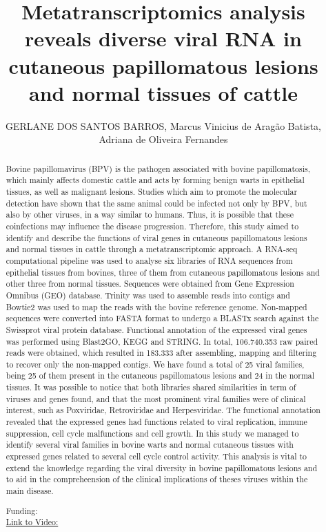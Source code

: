 \documentclass[twoside]{article}
\title{\vspace{-15mm}\fontsize{24pt}{10pt}\selectfont\textbf{ Metatranscriptomics analysis reveals diverse viral RNA in cutaneous papillomatous lesions and normal tissues of cattle }} %
\author{ GERLANE DOS SANTOS BARROS,  Marcus Vinicius de Arag\~ao Batista,  Adriana de Oliveira Fernandes }
\affil{ Federal University of Sergipe }
\date{}
\begin{document}
  
  
  \maketitle %
  
  
  \thispagestyle{fancy} %
  
  
  \begin{abstract}
  Bovine papillomavirus (BPV) is the pathogen associated with bovine papillomatosis,  which mainly affects domestic cattle and acts by forming benign warts in epithelial tissues,  as well as malignant lesions. Studies which aim to promote the molecular detection have shown that the same animal could be infected not only by BPV,  but also by other viruses,  in a way similar to humans. Thus,  it is possible that these coinfections may influence the disease progression. Therefore,  this study aimed to identify and describe the functions of viral genes in cutaneous papillomatous lesions and normal tissues in cattle through a metatranscriptomic approach. A RNA-seq computational pipeline was used to analyse six libraries of RNA sequences from epithelial tissues from bovines,  three of them from cutaneous papillomatous lesions and other three from normal tissues. Sequences were obtained from Gene Expression Omnibus (GEO) database. Trinity was used to assemble reads into contigs and Bowtie2 was used to map the reads with the bovine reference genome. Non-mapped sequences were converted into FASTA format to undergo a BLASTx search against the Swissprot viral protein database. Functional annotation of the expressed viral genes was performed using Blast2GO,  KEGG and STRING. In total,  106.740.353 raw paired reads were obtained,  which resulted in 183.333 after assembling,  mapping and filtering to recover only the non-mapped contigs. We have found a total of 25 viral families,  being 25 of them present in the cutaneous papillomatous lesions and 24 in the normal tissues. It was possible to notice that both libraries shared similarities in term of viruses and genes found,  and that the most prominent viral families were of clinical interest,  such as Poxviridae,  Retroviridae and Herpesviridae. The functional annotation revealed that the expressed genes had functions related to viral replication,  immune suppression,  cell cycle malfunctions and cell growth. In this study we managed to identify several viral families in bovine warts and normal cutaneous tissues with expressed genes related to several cell cycle control activity. This analysis is vital to extend the knowledge regarding the viral diversity in bovine papillomatous lesions and to aid in the compreheension of the clinical implications of theses viruses within the main disease.
  
  Funding:   \\
  \href{http://ab3c.org.br/xpress_pres2020/xmxp2020-294641.html}{Link to Video:}

  \end{abstract}
   
  
\end{document}

